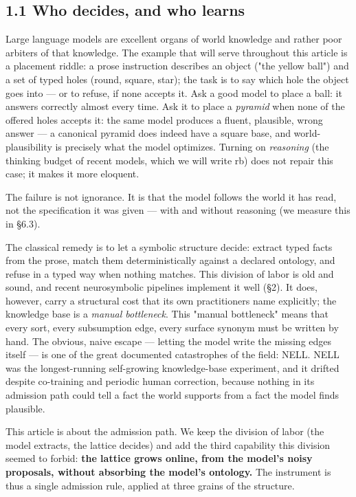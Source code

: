 \documentclass[11pt]{article}
\begin{document}
\subsection*{1.1 Who decides, and who learns}

Large language models are excellent organs of world knowledge and rather poor arbiters of that knowledge. The example that will serve throughout this article is a placement riddle: a prose instruction describes an object ("the yellow ball") and a set of typed holes (round, square, star); the task is to say which hole the object goes into — or to refuse, if none accepts it. Ask a good model to place a ball: it answers correctly almost every time. Ask it to place a \emph{pyramid} when none of the offered holes accepts it: the same model produces a fluent, plausible, wrong answer — a canonical pyramid does indeed have a square base, and world-plausibility is precisely what the model optimizes. Turning on \emph{reasoning} (the thinking budget of recent models, which we will write rb) does not repair this case; it makes it more eloquent.

The failure is not ignorance. It is that the model follows the world it has read, not the specification it was given — with and without reasoning (we measure this in §6.3).

The classical remedy is to let a symbolic structure decide: extract typed facts from the prose, match them deterministically against a declared ontology, and refuse in a typed way when nothing matches. This division of labor is old and sound, and recent neurosymbolic pipelines implement it well (§2). It does, however, carry a structural cost that its own practitioners name explicitly; the knowledge base is a \emph{manual bottleneck}. This "manual bottleneck" means that every sort, every subsumption edge, every surface synonym must be written by hand. The obvious, naive escape — letting the model write the missing edges itself — is one of the great documented catastrophes of the field: NELL. NELL was the longest-running self-growing knowledge-base experiment, and it drifted despite co-training and periodic human correction, because nothing in its admission path could tell a fact the world supports from a fact the model finds plausible.

This article is about the admission path. We keep the division of labor (the model extracts, the lattice decides) and add the third capability this division seemed to forbid: \textbf{the lattice grows online, from the model's noisy proposals, without absorbing the model's ontology.} The instrument is thus a single admission rule, applied at three grains of the structure.
\end{document}

